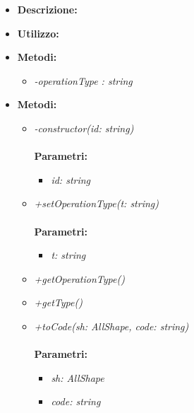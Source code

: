 \begin{itemize}
	\item \textbf{Descrizione:}\\
	
	\item \textbf{Utilizzo:}\\
	
	\item \textbf{Metodi:}
		\begin{itemize}
			\item \emph{-operationType : string}\\
    		
		\end{itemize}
	\item \textbf{Metodi:}
		\begin{itemize}
			\item \emph{-constructor(id: string)}\\
    		\\
    		\textbf{Parametri:}
    		\begin{itemize}
    			\item \emph{id: string}\\
    			
    		\end{itemize}
    		\item \emph{+setOperationType(t: string)}\\
    		\\
    		\textbf{Parametri:}
    		\begin{itemize}
    			\item \emph{t: string}\\
    			
    		\end{itemize}
    		\item \emph{+getOperationType()}\\
    		
    		\item \emph{+getType()}\\
    		
    		\item \emph{+toCode(sh: AllShape, code: string)}\\
    		\\
    		\textbf{Parametri:}
    		\begin{itemize}
    			\item \emph{sh: AllShape}\\
    			
    			\item \emph{code: string}\\
    			
    		\end{itemize}
    	\end{itemize}
\end{itemize}